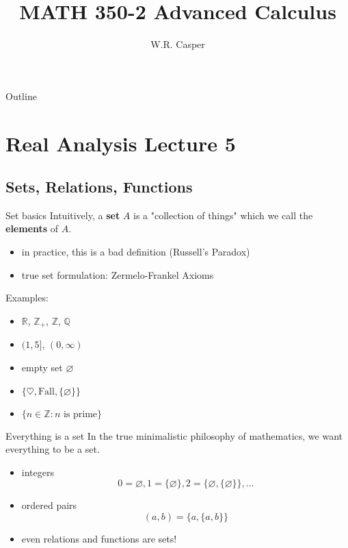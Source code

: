\documentclass{beamer}
\title{MATH 350-2 Advanced Calculus}
\subtitle
{} %
\author[W.R. Casper] %
{W.R. Casper}
\institute[California State University Fullerton] %
{
  Department of Mathematics\\
  California State University Fullerton}
\begin{document}
\begin{frame}
  \titlepage
\end{frame}

\begin{frame}{Outline}
  \tableofcontents
\end{frame}



\section{Real Analysis Lecture 5}

\subsection{Sets, Relations, Functions}

\begin{frame}{Set basics}
Intuitively, a \textbf{set} $A$ is a "collection of things" which we call the \textbf{elements} of $A$.
\begin{itemize}
\pause
\item in practice, this is a bad definition (Russell's Paradox)
\pause
\item true set formulation: Zermelo-Frankel Axioms
\end{itemize}
\pause
Examples:
\begin{itemize}
\pause
\item $\mathbb R$, $\mathbb{Z}_+$, $\mathbb{Z}$, $\mathbb{Q}$
\pause
\item $(1,5]$, $(0,\infty)$
\pause
\item empty set $\varnothing$
\pause
\item $\{\heartsuit,\text{Fall}, \{\varnothing\}\}$
\pause
\item $\{n\in \mathbb{Z}: \text{$n$ is prime}\}$
\end{itemize}
\end{frame}

\begin{frame}{Everything is a set}
In the true minimalistic philosophy of mathematics, we want everything to be a set.
\begin{itemize}
\pause
\item integers
\pause
$$0 = \varnothing, 1 = \{\varnothing\}, 2 = \{\varnothing,\{\varnothing\}\},\dots$$
\pause
\item ordered pairs
\pause
$$(a,b) = \{a,\{a,b\}\}$$
\pause
\item even relations and functions are sets!
\end{itemize}
\end{frame}
\end{document}
